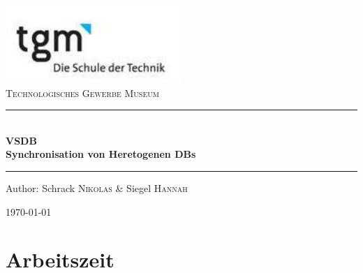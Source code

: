 \documentclass[12pt]{article}
\begin{document}
\begin{titlepage}
\begin{center}
\includegraphics[width=0.5\textwidth]{images/logo}\\[1cm]    

\textsc{\LARGE Technologisches Gewerbe Museum}\\[1.5cm]

\rule{12cm}{1mm}
{ \huge \bfseries  \\\large VSDB\\ \huge Synchronisation von Heretogenen DBs \\[0.4cm] }

\rule{12cm}{1mm}

\noindent 
\vspace{5cm}

\begin{center}
\large
Author: 
Schrack \textsc{Nikolas} \&
Siegel \textsc{Hannah}
\end{center}

\vfill

{\large \today}

\end{center}
\end{titlepage}

\tableofcontents



\newpage
\section{Arbeitszeit}
\end{document}
